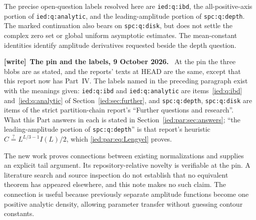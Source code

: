 \documentclass[11pt,letterpaper]{article}
\theoremstyle{remark}\newtheorem{remark}[theorem]{Remark}
\newcommand{\file}[1]{\nolinkurl{#1}}
\newenvironment{writenote}[1][]{\par\smallskip\begingroup\small
 \noindent\textbf{[write]}\if\relax\detokenize{#1}\relax\else~\textbf{#1.}\fi\ }%
 {\par\endgroup\smallskip}
\begin{document}
The precise open-question labels resolved here are
\file{ied:q:ibd}, the all-positive-axis portion of
\file{ied:q:analytic}, and the leading-amplitude portion of
\file{spc:q:depth}. The marked continuation also bears on
\file{spc:q:disk}, but does not settle the complex zero set or global
uniform asymptotic estimates. The mean-constant identities identify
amplitude derivatives requested beside the depth question.
\begin{writenote}[The pin and the labels, 9 October 2026]
At the pin the three blobs are as stated, and the reports' texts at HEAD are
the same, except that this report now has Part~IV. The labels named in the
preceding paragraph exist with the meanings given:
\file{ied:q:ibd} and \file{ied:q:analytic} are items~\ref{ied:q:ibd}
and~\ref{ied:q:analytic} of Section~\ref{ied:sec:further}, and \file{spc:q:depth},
\file{spc:q:disk} are items of the strict partition-chain report's
``Further questions and research''. What this Part answers in each is stated in
Section~\ref{ied:par:sec:answers}; ``the leading-amplitude portion of
\file{spc:q:depth}'' is that report's heuristic
$C\overset{?}{=}L^{L/3-1}I(L)/2$, which \eqref{ied:par:eq:Lengyel} proves.
\end{writenote}

The new work proves connections between existing normalizations and
supplies an explicit tail argument. Its repository-relative novelty
is verifiable at the pin. A literature search and source inspection do
not establish that no equivalent theorem has appeared elsewhere, and
this note makes no such claim. The connection is useful because
previously separate amplitude functions become one positive analytic
density, allowing parameter transfer without guessing contour constants.
\end{document}
